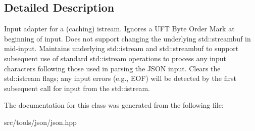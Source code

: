 \subsection{Detailed Description}
Input adapter for a (caching) istream. Ignores a U\+FT Byte Order Mark at beginning of input. Does not support changing the underlying std\+::streambuf in mid-\/input. Maintains underlying std\+::istream and std\+::streambuf to support subsequent use of standard std\+::istream operations to process any input characters following those used in parsing the J\+S\+ON input. Clears the std\+::istream flags; any input errors (e.\+g., E\+OF) will be detected by the first subsequent call for input from the std\+::istream. 

The documentation for this class was generated from the following file\+:\begin{DoxyCompactItemize}
\item 
src/tools/json/json.\+hpp\end{DoxyCompactItemize}
